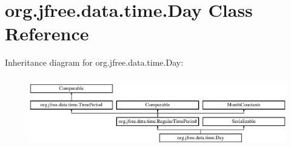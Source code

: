 \hypertarget{classorg_1_1jfree_1_1data_1_1time_1_1_day}{}\section{org.\+jfree.\+data.\+time.\+Day Class Reference}
\label{classorg_1_1jfree_1_1data_1_1time_1_1_day}
Inheritance diagram for org.\+jfree.\+data.\+time.\+Day\+:\begin{figure}[H]
\begin{center}
\leavevmode
\includegraphics[height=3.190883cm]{classorg_1_1jfree_1_1data_1_1time_1_1_day}
\end{center}
\end{figure}
